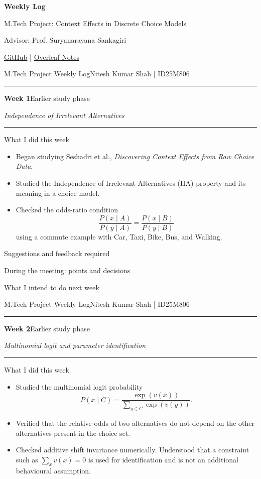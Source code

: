 \documentclass[10pt]{article}
\newcommand{\weekheading}[3]{%
  {\small M.Tech Project Weekly Log}\hfill{\small Nitesh Kumar Shah \;|\; ID25M806}\par
  \vspace{2pt}\hrule\vspace{7pt}
  {\Large\bfseries Week #1}\hfill{\normalsize #2}\par
  \vspace{2pt}
  {\itshape #3}\par
  \vspace{5pt}\hrule\vspace{7pt}
}
\newcommand{\blankentry}{\begin{center}\textemdash\end{center}}
\newcommand{\pastweekboxes}{%
  \begin{weeklybox}{Suggestions and feedback required}
    \blankentry
  \end{weeklybox}
  \begin{weeklybox}{During the meeting: points and decisions}
    \blankentry
  \end{weeklybox}
  \begin{weeklybox}{What I intend to do next week}
    \blankentry
  \end{weeklybox}
}
\begin{document}

\begin{center}
  {\LARGE\bfseries Weekly Log}\par
  \vspace{2pt}
  M.Tech Project: Context Effects in Discrete Choice Models\par
  Advisor: Prof. Suryanarayana Sankagiri\par
  \vspace{2pt}
  {\small
  \href{https://github.com/rbhdsks/Learning-from-Comparison-Data-Master-Thesis-Project-}{GitHub}
  \quad|\quad
  \href{https://www.overleaf.com/project/6a192de01f9877e35710e1d1}{Overleaf Notes}}
\end{center}

\vspace{8pt}
\weekheading{1}{Earlier study phase}{Independence of Irrelevant Alternatives}

\begin{weeklybox}{What I did this week}
  \begin{itemize}
    \item Began studying Seshadri et al., \emph{Discovering Context Effects from Raw Choice Data}.
    \item Studied the Independence of Irrelevant Alternatives (IIA) property and its meaning in a choice model.
    \item Checked the odds-ratio condition
    \[
      \frac{P(x\mid A)}{P(y\mid A)}
      =
      \frac{P(x\mid B)}{P(y\mid B)}
    \]
    using a commute example with Car, Taxi, Bike, Bus, and Walking.
  \end{itemize}
\end{weeklybox}

\pastweekboxes


\newpage
\weekheading{2}{Earlier study phase}{Multinomial logit and parameter identification}

\begin{weeklybox}{What I did this week}
  \begin{itemize}
    \item Studied the multinomial logit probability
    \[
      P(x\mid C)=\frac{\exp(v(x))}{\sum_{y\in C}\exp(v(y))}.
    \]
    \item Verified that the relative odds of two alternatives do not depend on the other alternatives present in the choice set.
    \item Checked additive shift invariance numerically. Understood that a constraint such as $\sum_x v(x)=0$ is used for identification and is not an additional behavioural assumption.
  \end{itemize}
\end{weeklybox}
\end{document}
